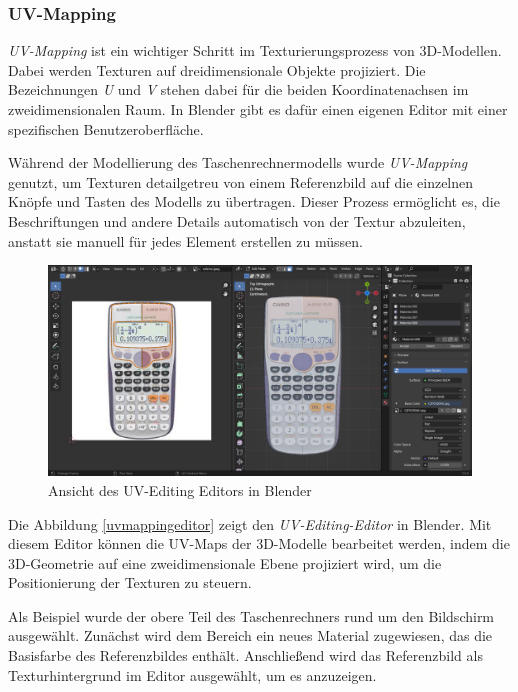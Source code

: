 \subsubsection*{UV-Mapping}
\textit{UV-Mapping} ist ein wichtiger Schritt im Texturierungsprozess von 3D-Modellen. Dabei werden Texturen auf
dreidimensionale Objekte projiziert. Die Bezeichnungen \textit{U} und \textit{V} stehen dabei für die beiden
Koordinatenachsen im zweidimensionalen Raum. In Blender gibt es dafür einen eigenen Editor mit einer spezifischen
Benutzeroberfläche.

Während der Modellierung des Taschenrechnermodells wurde \textit{UV-Mapping} genutzt, um Texturen detailgetreu von einem
Referenzbild auf die einzelnen Knöpfe und Tasten des Modells zu übertragen. Dieser Prozess ermöglicht es, die Beschriftungen
und andere Details automatisch von der Textur abzuleiten, anstatt sie manuell für jedes Element erstellen zu müssen.

\begin{figure}[H]
    \centering
    \includegraphics[width=1\textwidth]{images/uvmappingeditor.png}
    \caption{Ansicht des UV-Editing Editors in Blender}
    \label{fig:uvmappingeditor}
\end{figure}

Die Abbildung \ref{uvmappingeditor} zeigt den \textit{UV-Editing-Editor} in Blender. Mit diesem Editor können die UV-Maps der 3D-Modelle
bearbeitet werden, indem die 3D-Geometrie auf eine zweidimensionale Ebene projiziert wird, um die Positionierung der
Texturen zu steuern.

Als Beispiel wurde der obere Teil des Taschenrechners rund um den Bildschirm ausgewählt. Zunächst wird dem Bereich
ein neues Material zugewiesen, das die Basisfarbe des Referenzbildes enthält. Anschließend wird das Referenzbild als
Texturhintergrund im Editor ausgewählt, um es anzuzeigen.

